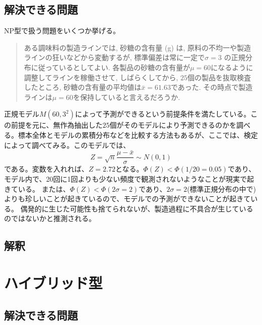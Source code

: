 \subsection{解決できる問題}
NP型で扱う問題をいくつか挙げる。
\begin{quote}
    ある調味料の製造ラインでは, 砂糖の含有量 (g) は, 原料の不均一や製造ラインの狂いなどから変動するが, 標準偏差は常に一定で$\sigma=3$ の正規分布に従っているとしてよい. 各製品の砂糖の含有量が$\mu=60$になるように調整してラインを稼働させて, しばらくしてから, $25$個の製品を抜取検査したところ, 砂糖の含有量の平均値は$\bar{x}=61.63$であった. その時点で製造ラインは$\mu=60$を保持していると言えるだろうか.

\end{quote}
正規モデル$M(60,3^2)$によって予測ができるという前提条件を満たしている。この前提を元に、無作為抽出した$25$個がそのモデルにより予測できるのかを調べる。標本全体とモデルの累積分布などを比較する方法もあるが、ここでは、検定によって調べてみる。このモデルでは、
\begin{equation*}
    Z=\sqrt{n}\frac{\mu-\bar{x}}{\sigma} \sim N(0,1)
\end{equation*}
である。変数を入れれば、$Z=2.72$となる。$\varPhi(Z)<\varPhi(1/20=0.05)$であり、モデル内で、20回に1回よりも少ない頻度で観測されないようなことが現実で起きている。
または、$\varPhi(Z)<\varPhi(2\sigma=2)$であり、$2\sigma=2$(標準正規分布の中で)よりも珍しいことが起きているので、モデルでの予測ができないことが起きている。
偶発的に生じた可能性も捨てられないが、製造過程に不具合が生じているのではないかと推測される。



\subsection{解釈}


\section{ハイブリッド型}
\subsection{解決できる問題}


